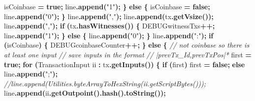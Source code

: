 \documentclass[
  italian,
  openany]{book}
\newenvironment{Shaded}{\begin{snugshade}}{\end{snugshade}}
\newcommand{\CommentTok}[1]{\textcolor[rgb]{0.56,0.35,0.01}{\textit{#1}}}
\newcommand{\ControlFlowTok}[1]{\textcolor[rgb]{0.13,0.29,0.53}{\textbf{#1}}}
\newcommand{\FunctionTok}[1]{\textcolor[rgb]{0.13,0.29,0.53}{\textbf{#1}}}
\newcommand{\KeywordTok}[1]{\textcolor[rgb]{0.13,0.29,0.53}{\textbf{#1}}}
\newcommand{\NormalTok}[1]{#1}
\newcommand{\OperatorTok}[1]{\textcolor[rgb]{0.81,0.36,0.00}{\textbf{#1}}}
\newcommand{\StringTok}[1]{\textcolor[rgb]{0.31,0.60,0.02}{#1}}
\begin{document}
\begin{Shaded}
\begin{Highlighting}[]
\NormalTok{            isCoinbase }\OperatorTok{=} \KeywordTok{true}\OperatorTok{;}
\NormalTok{            line}\OperatorTok{.}\FunctionTok{append}\OperatorTok{(}\StringTok{"1"}\OperatorTok{);}
        \OperatorTok{\}} \ControlFlowTok{else} \OperatorTok{\{}
\NormalTok{            isCoinbase }\OperatorTok{=} \KeywordTok{false}\OperatorTok{;}
\NormalTok{            line}\OperatorTok{.}\FunctionTok{append}\OperatorTok{(}\StringTok{"0"}\OperatorTok{);}
        \OperatorTok{\}}
\NormalTok{        line}\OperatorTok{.}\FunctionTok{append}\OperatorTok{(}\StringTok{","}\OperatorTok{);}
\NormalTok{        line}\OperatorTok{.}\FunctionTok{append}\OperatorTok{(}\NormalTok{tx}\OperatorTok{.}\FunctionTok{getVsize}\OperatorTok{());}
\NormalTok{        line}\OperatorTok{.}\FunctionTok{append}\OperatorTok{(}\StringTok{","}\OperatorTok{);}
        \ControlFlowTok{if} \OperatorTok{(}\NormalTok{tx}\OperatorTok{.}\FunctionTok{hasWitnesses}\OperatorTok{())} \OperatorTok{\{}
\NormalTok{            DEBUGwitnessTxs}\OperatorTok{++;}
\NormalTok{            line}\OperatorTok{.}\FunctionTok{append}\OperatorTok{(}\StringTok{"1"}\OperatorTok{);}
        \OperatorTok{\}} \ControlFlowTok{else} \OperatorTok{\{}
\NormalTok{            line}\OperatorTok{.}\FunctionTok{append}\OperatorTok{(}\StringTok{"0"}\OperatorTok{);}
        \OperatorTok{\}}
\NormalTok{        line}\OperatorTok{.}\FunctionTok{append}\OperatorTok{(}\StringTok{":"}\OperatorTok{);}
        \ControlFlowTok{if} \OperatorTok{(}\NormalTok{isCoinbase}\OperatorTok{)} \OperatorTok{\{}
\NormalTok{            DEBUGcoinbaseCounter}\OperatorTok{++;}
        \OperatorTok{\}} \ControlFlowTok{else} \OperatorTok{\{}
            \CommentTok{// not coinbase so there is at least one input}
            \CommentTok{// save inputs in the format}
            \CommentTok{// |prevTx\_Id,prevTxPos|*}
\NormalTok{            first }\OperatorTok{=} \KeywordTok{true}\OperatorTok{;}
            \ControlFlowTok{for} \OperatorTok{(}\NormalTok{TransactionInput ii }\OperatorTok{:}\NormalTok{ tx}\OperatorTok{.}\FunctionTok{getInputs}\OperatorTok{())} \OperatorTok{\{}
                \ControlFlowTok{if} \OperatorTok{(}\NormalTok{first}\OperatorTok{)}\NormalTok{ first }\OperatorTok{=} \KeywordTok{false}\OperatorTok{;}
                \ControlFlowTok{else}\NormalTok{ line}\OperatorTok{.}\FunctionTok{append}\OperatorTok{(}\StringTok{";"}\OperatorTok{);}
                \CommentTok{//line.append(Utilities.byteArrayToHexString(ii.getScriptBytes()));}
\NormalTok{                line}\OperatorTok{.}\FunctionTok{append}\OperatorTok{(}\NormalTok{ii}\OperatorTok{.}\FunctionTok{getOutpoint}\OperatorTok{().}\FunctionTok{hash}\OperatorTok{().}\FunctionTok{toString}\OperatorTok{());}

\end{Highlighting}
\end{Shaded}
\end{document}

